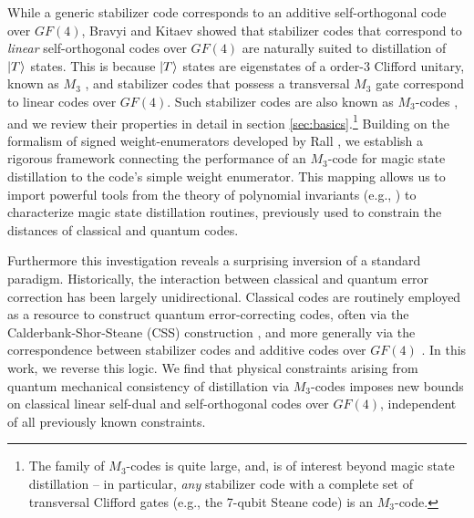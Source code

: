 \documentclass[11pt]{article}
\def\ket#1{\mathinner{|{#1}\rangle}}
\begin{document}
While a generic stabilizer code corresponds to an additive self-orthogonal code over $GF(4)$, Bravyi and Kitaev \cite{MSD} showed that stabilizer codes that correspond to \textit{linear} self-orthogonal codes over $GF(4)$ are naturally suited to distillation of $\ket{T}$ states. This is because $\ket{T}$ states are eigenstates of a order-3 Clifford unitary, known as $M_3$ \cite{rall2017signed}, and stabilizer codes that possess a transversal $M_3$ gate correspond to linear codes over $GF(4)$. Such stabilizer codes are also known as $M_3$-codes \cite{rall2017signed}, and we review their properties in detail in section \ref{sec:basics}.\footnote{The family of $M_3$-codes is quite large, and, is of interest beyond magic state distillation --  in particular, \textit{any} stabilizer code with a complete set of transversal Clifford gates (e.g., the 7-qubit Steane code) is an $M_3$-code.}  Building on the formalism of signed weight-enumerators developed by Rall \cite{rall2017signed}, we establish a rigorous framework connecting the performance of an $M_3$-code for magic state distillation to the code's simple weight enumerator. This mapping allows us to import powerful tools from the theory of polynomial invariants (e.g., \cite{MALLOWS197568,rains, rains2002self}) 
to characterize magic state distillation routines, previously used to constrain the distances of classical and quantum codes.

Furthermore this investigation reveals a surprising inversion of a standard paradigm. Historically, the interaction between classical and quantum error correction has been largely unidirectional. Classical codes are routinely employed as a resource to construct quantum error-correcting codes, often via the Calderbank-Shor-Steane (CSS) construction \cite{calderbank1996good, steane1996multiple}, and more generally via the correspondence between stabilizer codes and additive codes over $GF(4)$ \cite{calderbank1998quantum}.  In this work, we reverse this logic. We find that physical constraints arising from quantum mechanical consistency of distillation via $M_3$-codes imposes new bounds on classical linear self-dual and self-orthogonal codes over $GF(4)$, independent of all previously known constraints. 
\end{document}
